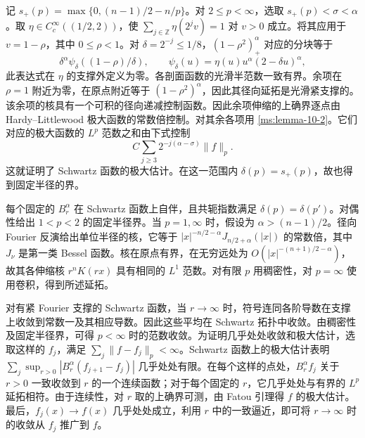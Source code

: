 记 $s_+(p)=\max\{0,(n-1)/2-n/p\}$。对 $2\le p<\infty$，选取 $s_+(p)<\sigma<\alpha$。取 $\eta\in C_c^\infty((1/2,2))$，使 $\sum_{j\in\mathbb Z}\eta(2^jv)=1$ 对 $v>0$ 成立。将其应用于 $v=1-\rho$，其中 $0\le\rho<1$。对 $\delta=2^{-j}\le1/8$，$(1-\rho^2)_+^\alpha$ 对应的分块等于
\[
\delta^\alpha\psi_\delta((1-\rho)/\delta),\qquad
\psi_\delta(u)=\eta(u)u^\alpha(2-\delta u)^\alpha,
\]
此表达式在 $\eta$ 的支撑外定义为零。各剖面函数的光滑半范数一致有界。余项在 $\rho=1$ 附近为零，在原点附近等于 $(1-\rho^2)^\alpha$，因此其径向延拓是光滑紧支撑的。该余项的核具有一个可积的径向递减控制函数。因此余项伸缩的上确界逐点由 Hardy--Littlewood 极大函数的常数倍控制。对其余各项用 \ref{ms:lemma-10-2}。它们对应的极大函数的 $L^p$ 范数之和由下式控制
\[
C\sum_{j\ge3}2^{-j(\alpha-\sigma)}\|f\|_p.
\]
这就证明了 Schwartz 函数的极大估计。在这一范围内 $\delta(p)=s_+(p)$，故也得到固定半径的界。

每个固定的 $B_r^\alpha$ 在 Schwartz 函数上自伴，且共轭指数满足 $\delta(p)=\delta(p')$。对偶性给出 $1<p<2$ 的固定半径界。当 $p=1,\infty$ 时，假设为 $\alpha>(n-1)/2$。径向 Fourier 反演给出单位半径的核，它等于 $|x|^{-n/2-\alpha}J_{n/2+\alpha}(|x|)$ 的常数倍，其中 $J_\nu$ 是第一类 Bessel 函数。核在原点有界，在无穷远处为 $O(|x|^{-(n+1)/2-\alpha})$，故其各伸缩核 $r^nK(rx)$ 具有相同的 $L^1$ 范数。对有限 $p$ 用稠密性，对 $p=\infty$ 使用卷积，得到所述延拓。

对有紧 Fourier 支撑的 Schwartz 函数，当 $r\to\infty$ 时，符号连同各阶导数在支撑上收敛到常数一及其相应导数。因此这些平均在 Schwartz 拓扑中收敛。由稠密性及固定半径界，可得 $p<\infty$ 时的范数收敛。为证明几乎处处收敛和极大估计，选取这样的 $f_j$，满足 $\sum_j\|f-f_j\|_p<\infty$。Schwartz 函数上的极大估计表明 $\sum_j\sup_{r>0}|B_r^\alpha(f_{j+1}-f_j)|$ 几乎处处有限。在每个这样的点处，$B_r^\alpha f_j$ 关于 $r>0$ 一致收敛到 $r$ 的一个连续函数；对于每个固定的 $r$，它几乎处处与有界的 $L^p$ 延拓相符。由于连续性，对 $r$ 取的上确界可测，由 Fatou 引理得 $f$ 的极大估计。最后，$f_j(x)\to f(x)$ 几乎处处成立，利用 $r$ 中的一致逼近，即可将 $r\to\infty$ 时的收敛从 $f_j$ 推广到 $f$。
